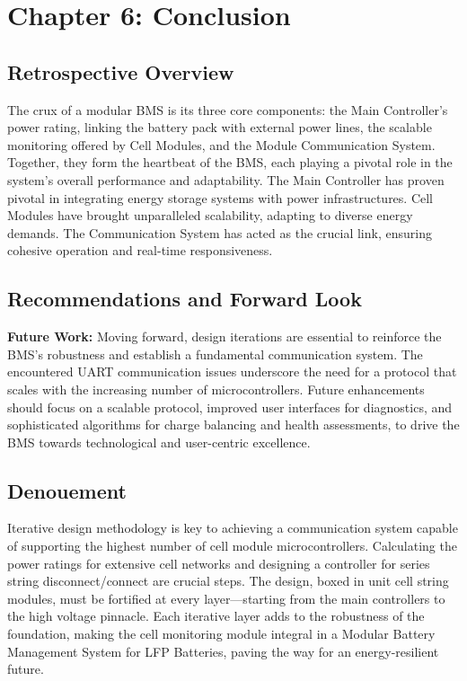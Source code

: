 \chapter[Conclusion]{Chapter 6: Conclusion}\label{chap:last}%
\section{Retrospective Overview}\label{sec:retro_ovv}
The crux of a modular BMS is its three core components: the Main Controller's power rating, linking the battery pack with external power lines, the scalable monitoring offered by Cell Modules, and the Module Communication System. Together, they form the heartbeat of the BMS, each playing a pivotal role in the system's overall performance and adaptability. The Main Controller has proven pivotal in integrating energy storage systems with power infrastructures. Cell Modules have brought unparalleled scalability, adapting to diverse energy demands. The Communication System has acted as the crucial link, ensuring cohesive operation and real-time responsiveness.
\section{Recommendations and Forward Look}\label{sec:recommend}
\textbf{Future Work:} Moving forward, design iterations are essential to reinforce the BMS's robustness and establish a fundamental communication system. The encountered UART communication issues underscore the need for a protocol that scales with the increasing number of microcontrollers. Future enhancements should focus on a scalable protocol, improved user interfaces for diagnostics, and sophisticated algorithms for charge balancing and health assessments, to drive the BMS towards technological and user-centric excellence.
\section{Denouement}\label{sec:last_CON}
Iterative design methodology is key to achieving a communication system capable of supporting the highest number of cell module microcontrollers. Calculating the power ratings for extensive cell networks and designing a controller for series string disconnect/connect are crucial steps. The design, boxed in unit cell string modules, must be fortified at every layer—starting from the main controllers to the high voltage pinnacle. Each iterative layer adds to the robustness of the foundation, making the cell monitoring module integral in a Modular Battery Management System for LFP Batteries, paving the way for an energy-resilient future.

\vfill
